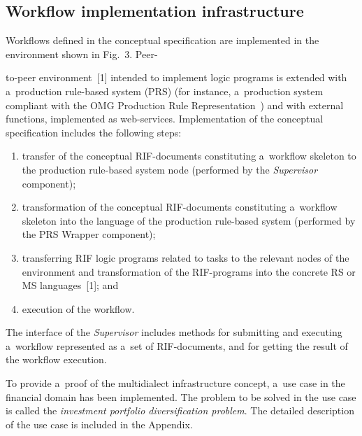 \begin{multicols}{2}
\vspace*{-6pt}

\subsection{Workflow implementation infrastructure}

  \noindent
  Workflows defined in the conceptual specification are implemented in the
environment shown in Fig.~3. Peer-\linebreak\vspace*{-12pt}

\pagebreak

\noindent
to-peer environment~[1] intended to implement logic
programs is extended with a~production rule-based system (PRS) (for
instance, a~production system compliant with the OMG Production Rule
Representation~\cite{16-kal}) and with external functions, implemented as
  web-services. Implementation of the conceptual specification includes the
following steps:
  \begin{enumerate}[(1)]
\item transfer of the conceptual RIF-documents constituting a~workflow skeleton to
the production rule-based system node (performed by the \textit{Supervisor} component);\\[-14pt]
\item transformation of the conceptual RIF-documents constituting a~workflow
skeleton into the language of the production rule-based system (performed by the PRS
Wrapper component);\\[-14pt]
\item transferring RIF logic programs related to tasks to the relevant nodes of the
environment and transformation of the RIF-programs into the concrete RS or MS
languages~[1]; and\\[-14pt]
\item execution of the workflow.
\end{enumerate}


  The interface of the \textit{Supervisor} includes methods for submitting and
executing a~workflow represented as a~set of RIF-documents, and for getting the
result of the workflow execution.

  To provide a~proof of the multidialect infrastructure concept, a~use case in the
financial domain has been implemented. The problem to be solved in the use case is
called the \textit{investment portfolio diversification problem}. The detailed
description of the use case is included in the Appendix.


\end{multicols}
